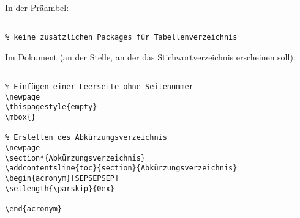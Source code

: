 
In der Präambel:

\begin{verbatim}

% keine zusätzlichen Packages für Tabellenverzeichnis

\end{verbatim}

\tcblower

Im Dokument (an der Stelle, an der das Stichwortverzeichnis erscheinen soll): 

\begin{verbatim}

% Einfügen einer Leerseite ohne Seitenummer
\newpage
\thispagestyle{empty}
\mbox{}

% Erstellen des Abkürzungsverzeichnis
\newpage
\section*{Abkürzungsverzeichnis} 
\addcontentsline{toc}{section}{Abkürzungsverzeichnis}
\begin{acronym}[SEPSEPSEP]
\setlength{\parskip}{0ex}

\end{acronym}

\end{verbatim}
